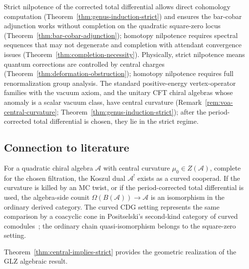 \begin{remark}\label{rem:why-strict-matters}
Strict nilpotence of the corrected total differential allows direct cohomology computation
(Theorem~\ref{thm:genus-induction-strict}) and ensures the bar-cobar
adjunction works without completion on the quadratic square-zero locus
(Theorem~\ref{thm:bar-cobar-adjunction}); homotopy nilpotence
requires spectral sequences that may not degenerate and completion
with attendant convergence issues
(Theorem~\ref{thm:completion-necessity}). Physically, strict
nilpotence means quantum corrections are controlled by central charges
(Theorem~\ref{thm:deformation-obstruction}); homotopy nilpotence
requires full renormalization group analysis. The standard
positive-energy vertex-operator families with the vacuum axiom, and
the unitary CFT chiral algebras whose anomaly is a scalar vacuum
class, have central curvature
(Remark~\ref{rem:voa-central-curvature};
Theorem~\ref{thm:genus-induction-strict}); after the
period-corrected total differential is chosen, they lie in the strict
regime.
\end{remark}

\subsection{Connection to literature}

\begin{theorem}\label{thm:glz-curved}
For a quadratic chiral algebra $\mathcal{A}$ with central curvature
$\mu_0 \in Z(\mathcal{A})$, complete for the chosen filtration, the
Koszul dual $\mathcal{A}^!$ exists as a curved cooperad. If the
curvature is killed by an MC twist, or if the period-corrected total
differential is used, the algebra-side counit
$\Omega(B(\mathcal{A})) \to \mathcal{A}$ is an isomorphism in the
ordinary derived category. The curved CDG setting represents the same
comparison by a coacyclic cone in Positselski's second-kind category
of curved comodules~\textup{\cite{GLZ22,Positselski11}}; the ordinary
chain quasi-isomorphism belongs to the square-zero setting.
\end{theorem}

Theorem~\ref{thm:central-implies-strict} provides the geometric
realization of the GLZ algebraic result.

